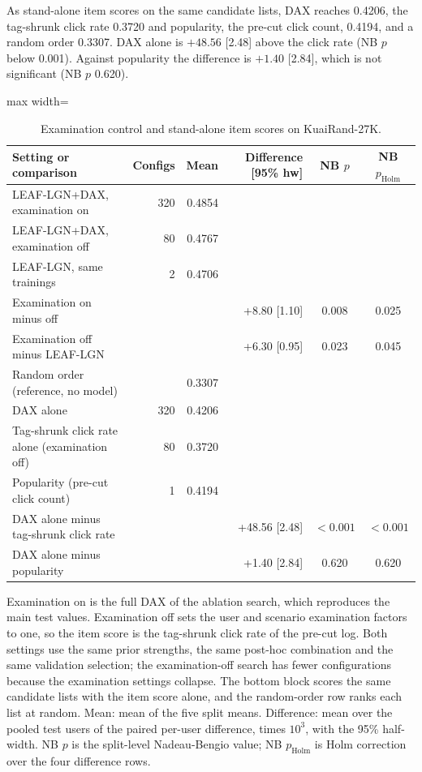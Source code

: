 \documentclass[preprint,12pt,authoryear]{elsarticle}
\begin{document}
As stand-alone item scores on the same candidate lists, DAX reaches 0.4206, the tag-shrunk click rate 0.3720 and popularity, the pre-cut click
count, 0.4194, and a random order 0.3307. DAX alone is $+48.56$ [2.48] above the click rate (NB $p$ below 0.001). Against popularity the difference is $+1.40$ [2.84],
which is not significant (NB $p$ 0.620).

\begin{table}[tbp]
\centering
\footnotesize
\caption{Examination control and stand-alone item scores on KuaiRand-27K.}
\label{tab:exam}
\begin{adjustbox}{max width=\linewidth}
\begin{tabular}{lrrrcc}
\toprule
Setting or comparison & Configs & Mean & Difference [95\% hw] & NB $p$ & NB $p_{\mathrm{Holm}}$ \\
\midrule
LEAF-LGN+DAX, examination on & 320 & 0.4854 &  &  &  \\
LEAF-LGN+DAX, examination off & 80 & 0.4767 &  &  &  \\
LEAF-LGN, same trainings & 2 & 0.4706 &  &  &  \\
\midrule
Examination on minus off &  &  & +8.80 [1.10] & 0.008 & 0.025 \\
Examination off minus LEAF-LGN &  &  & +6.30 [0.95] & 0.023 & 0.045 \\
\midrule
Random order (reference, no model) &  & 0.3307 &  &  &  \\
DAX alone & 320 & 0.4206 &  &  &  \\
Tag-shrunk click rate alone (examination off) & 80 & 0.3720 &  &  &  \\
Popularity (pre-cut click count) & 1 & 0.4194 &  &  &  \\
\midrule
DAX alone minus tag-shrunk click rate &  &  & +48.56 [2.48] & $<0.001$ & $<0.001$ \\
DAX alone minus popularity &  &  & +1.40 [2.84] & 0.620 & 0.620 \\
\bottomrule
\end{tabular}
\end{adjustbox}
\par\smallskip
\begin{minipage}{\linewidth}\raggedright\footnotesize Examination on is the full DAX of the ablation search, which reproduces the main test values. Examination off sets the user and scenario examination factors to one, so the item score is the tag-shrunk click rate of the pre-cut log. Both settings use the same prior strengths, the same post-hoc combination and the same validation selection; the examination-off search has fewer configurations because the examination settings collapse. The bottom block scores the same candidate lists with the item score alone, and the random-order row ranks each list at random. Mean: mean of the five split means. Difference: mean over the pooled test users of the paired per-user difference, times $10^{3}$, with the 95\% half-width. NB $p$ is the split-level Nadeau-Bengio value; NB $p_{\mathrm{Holm}}$ is Holm correction over the four difference rows.\end{minipage}
\end{table}
\end{document}
